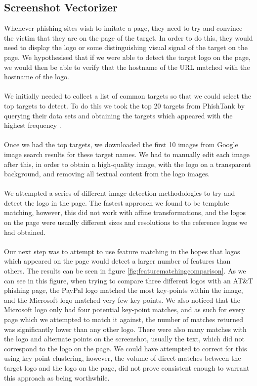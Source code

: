 \documentclass[12pt,twoside]{report}
\begin{document}
\subsection{Screenshot Vectorizer}\label{screenshotvectorizer}
Whenever phishing sites wish to imitate a page, they need to try and convince the victim that they are on the page of the target. In order to do this, they would need to display the logo or some distinguishing visual signal of the target on the page. We hypothesised that if we were able to detect the target logo on the page, we would then be able to verify that the hostname of the URL matched with the hostname of the logo.
\\\\
We initially needed to collect a list of common targets so that we could select the top targets to detect. To do this we took the top 20 targets from PhishTank by querying their data sets and obtaining the targets which appeared with the highest frequency \cite{phishtank}.
\\\\
Once we had the top targets, we downloaded the first 10 images from Google image search results for these target names. We had to manually edit each image after this, in order to obtain a high-quality image, with the logo on a transparent background, and removing all textual content from the logo images. 
\\\\
We attempted a series of different image detection methodologies to try and detect the logo in the page. The fastest approach we found to be template matching, however, this did not work with affine transformations, and the logos on the page were usually different sizes and resolutions to the reference logos we had obtained.
\\\\
Our next step was to attempt to use feature matching in the hopes that logos which appeared on the page would detect a larger number of features than others. The results can be seen in figure \ref{fig:featurematchingcomparison}. As we can see in this figure, when trying to compare three different logos with an AT\&T phishing page, the PayPal logo matched the most key-points within the image, and the Microsoft logo matched very few key-points. We also noticed that the Microsoft logo only had four potential key-point matches, and as such for every page which we attempted to match it against, the number of matches returned was significantly lower than any other logo. There were also many matches with the logo and alternate points on the screenshot, usually the text, which did not correspond to the logo on the page. We could have attempted to correct for this using key-point clustering, however, the volume of direct matches between the target logo and the logo on the page, did not prove consistent enough to warrant this approach as being worthwhile.
\end{document}
